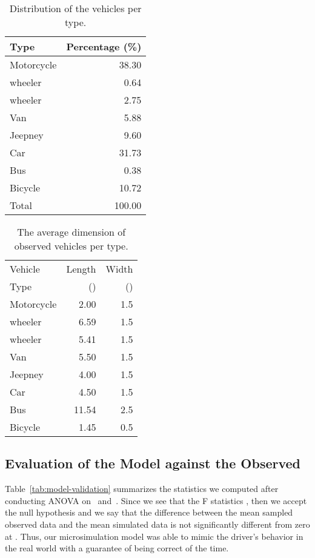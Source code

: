 \documentclass[preprint]{./acm_proc_article-sp}
\begin{document}
\begin{table}[bth]
\caption{Distribution of the vehicles per type.}\label{tab:vehicle-type}
\centering\begin{tabular}{lr}
\hline\hline
Type &  Percentage (\%) \\
\hline
Motorcycle           &  38.30\\
 wheeler  &   0.64\\
 wheeler  &   2.75\\
Van                  &   5.88\\
Jeepney              &   9.60\\
Car                  &  31.73\\
Bus                  &   0.38\\
Bicycle              &  10.72\\
\hline
Total                & 100.00\\
\hline\hline
\end{tabular}
\end{table}

\begin{table}[bth]
\caption{The average dimension of observed vehicles per type.}\label{tab:vehicle-dimension}
\centering\begin{tabular}{lrr}
\hline\hline
Vehicle & Length & Width \\
Type    & ()    & ()  \\
\hline
Motorcycle           &  2.00 & 1.5\\
 wheeler  &  6.59 & 1.5\\
 wheeler  &  5.41 & 1.5\\
Van                  &  5.50 & 1.5\\
Jeepney              &  4.00 & 1.5\\
Car                  &  4.50 & 1.5\\
Bus                  & 11.54 & 2.5\\
Bicycle              &  1.45 & 0.5\\
\hline\hline
\end{tabular}
\end{table}


\subsection{Evaluation of the Model against the Observed}

Table~\ref{tab:model-validation} summarizes the statistics we computed after conducting ANOVA on~ and~. Since we see that the F statistics , then we accept the null hypothesis  and we say that the difference between the mean sampled observed data  and the mean simulated data  is not significantly different from zero at . Thus, our microsimulation model was able to mimic the driver's behavior in the real world with a guarantee of being correct  of the time.
\end{document}
